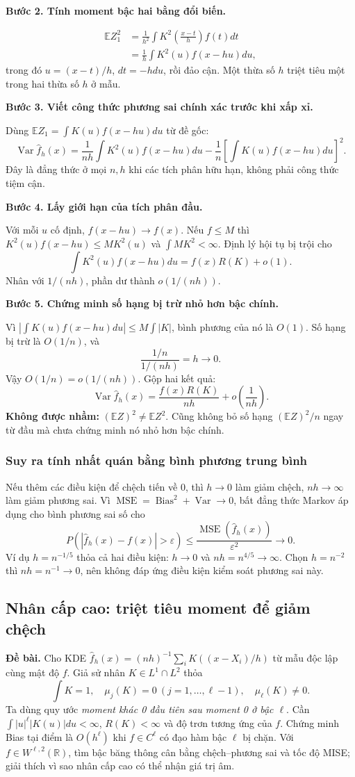 \documentclass[11pt,a4paper]{article}
\DeclareMathOperator{\MSE}{MSE}
\newcommand{\E}{\mathbb E}
\newcommand{\R}{\mathbb R}
\newcommand{\fh}{\widehat f_h}
\DeclareMathOperator{\Var}{Var}
\DeclareMathOperator{\Bias}{Bias}
\newcommand{\buoc}[1]{\par\medskip\textbf{#1}\par}
\begin{document}
\buoc{Bước 2. Tính moment bậc hai bằng đổi biến.}
\begin{align*}
\E Z_1^2
&=\frac1{h^2}\int K^2\!\left(\frac{x-t}{h}\right)f(t)dt\\
&=\frac1h\int K^2(u)f(x-hu)du,
\end{align*}
trong đó $u=(x-t)/h$, $dt=-hdu$, rồi đảo cận. Một thừa số $h$ triệt tiêu một trong hai thừa số $h$ ở mẫu.

\buoc{Bước 3. Viết công thức phương sai chính xác trước khi xấp xỉ.}
Dùng $\E Z_1=\int K(u)f(x-hu)du$ từ đề gốc:
\[
\boxed{\Var\fh(x)=\frac1{nh}\int K^2(u)f(x-hu)du
-\frac1n\left[\int K(u)f(x-hu)du\right]^2.}
\]
Đây là đẳng thức ở mọi $n,h$ khi các tích phân hữu hạn, không phải công thức tiệm cận.

\buoc{Bước 4. Lấy giới hạn của tích phân đầu.}
Với mỗi $u$ cố định, $f(x-hu)\to f(x)$. Nếu $f\leq M$ thì
$K^2(u)f(x-hu)\leq M K^2(u)$ và $\int M K^2<\infty$. Định lý hội tụ bị trội cho
\[
\int K^2(u)f(x-hu)du=f(x)R(K)+o(1).
\]
Nhân với $1/(nh)$, phần dư thành $o(1/(nh))$.

\buoc{Bước 5. Chứng minh số hạng bị trừ nhỏ hơn bậc chính.}
Vì $|\int K(u)f(x-hu)du|\leq M\int|K|$, bình phương của nó là $O(1)$. Số hạng bị trừ là $O(1/n)$, và
\[
\frac{1/n}{1/(nh)}=h\longrightarrow0.
\]
Vậy $O(1/n)=o(1/(nh))$. Gộp hai kết quả:
\[
\boxed{\Var\fh(x)=\frac{f(x)R(K)}{nh}+o\!\left(\frac1{nh}\right).}
\]
\textbf{Không được nhầm:} $(\E Z)^2\ne\E Z^2$. Cũng không bỏ số hạng $(\E Z)^2/n$ ngay từ đầu mà chưa chứng minh nó nhỏ hơn bậc chính.

\subsubsection*{Suy ra tính nhất quán bằng bình phương trung bình}
Nếu thêm các điều kiện để chệch tiến về 0, thì $h\to0$ làm giảm chệch, $nh\to\infty$ làm giảm phương sai. Vì
$\MSE=\Bias^2+\Var\to0$, bất đẳng thức Markov áp dụng cho bình phương sai số cho
\[
P(|\fh(x)-f(x)|>\varepsilon)\leq\frac{\MSE(\fh(x))}{\varepsilon^2}\to0.
\]
Ví dụ $h=n^{-1/5}$ thỏa cả hai điều kiện: $h\to0$ và $nh=n^{4/5}\to\infty$. Chọn $h=n^{-2}$ thì $nh=n^{-1}\to0$, nên không đáp ứng điều kiện kiểm soát phương sai này.

\subsection{Nhân cấp cao: triệt tiêu moment để giảm chệch}\label{sec:highorder}
\textbf{Đề bài.} Cho KDE $\widehat f_h(x)=(nh)^{-1}\sum_iK((x-X_i)/h)$
từ mẫu độc lập cùng mật độ $f$. Giả sử nhân $K\in L^1\cap L^2$ thỏa
\[
\int K=1,\quad \mu_j(K)=0\ (j=1,\ldots,\ell-1),\quad
\mu_\ell(K)\ne0.
\]
Ta dùng quy ước \emph{moment khác 0 đầu tiên sau moment 0 ở bậc $\ell$}. Cần $\int|u|^\ell|K(u)|du<\infty$, $R(K)<\infty$ và độ trơn tương ứng của $f$.
Chứng minh Bias tại điểm là $O(h^\ell)$ khi $f\in C^\ell$ có đạo hàm bậc $\ell$ bị chặn.
Với $f\in W^{\ell,2}(\R)$, tìm bậc băng thông cân bằng chệch--phương sai và tốc độ MISE;
giải thích vì sao nhân cấp cao có thể nhận giá trị âm.
\end{document}
